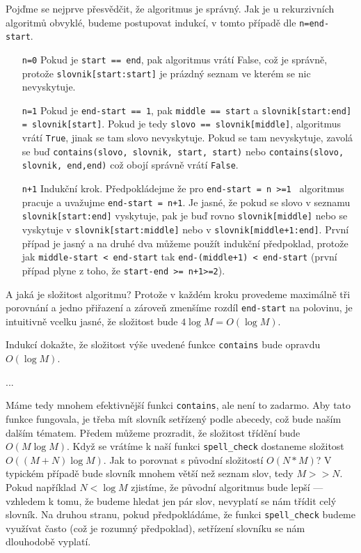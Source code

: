 Pojďme se nejprve přesvědčit, že algoritmus je správný. Jak je u rekurzivních algoritmů obvyklé, budeme postupovat indukcí, v tomto případě dle {\tt n=end-start}.
\begin{itemize}
 \item[{\tt n=0}] Pokud je {\tt start == end}, pak algoritmus vrátí False, což je správně, protože {\tt slovnik[start:start]} je prázdný seznam ve kterém se nic nevyskytuje.
 \item[{\tt n=1}] Pokud je {\tt end-start == 1}, pak {\tt middle == start} a {\tt slovnik[start:end] = slovnik[start]}. Pokud je tedy {\tt slovo == slovnik[middle]}, algoritmus
vrátí {\tt True}, jinak se tam slovo nevyskytuje. Pokud se tam nevyskytuje, zavolá se buď {\tt contains(slovo, slovnik, start, start)} nebo {\tt contains(slovo, slovnik, end,end)} což obojí
správně vrátí {\tt False}.
 \item[{\tt n+1}] Indukční krok. Předpokládejme že pro {\tt end-start = n >=1 } algoritmus pracuje a uvažujme {\tt end-start = n+1}. Je jasné, že 
pokud se slovo v seznamu {\tt slovnik[start:end]} vyskytuje, pak je buď rovno {\tt slovnik[middle]} nebo se vyskytuje v {\tt slovnik[start:middle]} nebo v {\tt slovnik[middle+1:end]}.
První případ je jasný a na druhé dva můžeme použít indukční předpoklad, protože jak {\tt middle-start < end-start} tak {\tt end-(middle+1) < end-start} (první
případ plyne z toho, že {\tt start-end >= n+1>=2}).
\end{itemize}

A jaká je složitost algoritmu? Protože v každém kroku provedeme maximálně tři porovnání a jedno přiřazení a zároveň zmenšíme rozdíl {\tt end-start} na polovinu,
je intuitivně vcelku jasné, že složitost bude $4\log M = O(\log M)$.

\begin{cviceni} Indukcí dokažte, že složitost výše uvedené funkce {\tt contains} bude opravdu $O(\log M)$.
\end{cviceni}
\begin{reseni} ...
\end{reseni}

Máme tedy mnohem efektivnější funkci {\tt contains}, ale není to zadarmo. Aby tato funkce fungovala, je třeba mít slovník setřízený podle abecedy, což bude naším dalším tématem.
Předem můžeme prozradit, že složitost třídění bude $O(M\log M)$. Když se vrátíme k naší funkci {\tt spell\_check} dostaneme složitost $O((M+N)\log M)$. Jak to porovnat
s původní složitostí $O(N*M)$? V typickém případě bude slovník mnohem větší než seznam slov, tedy $M>>N$. Pokud například $N<\log M$ zjistíme, že původní algoritmus
bude lepší --- vzhledem k tomu, že budeme hledat jen pár slov, nevyplatí se nám třídit celý slovník. Na druhou stranu, pokud předpokládáme, že funkci {\tt spell\_check}
budeme využívat často (což je rozumný předpoklad), setřízení slovníku se nám dlouhodobě vyplatí. 

